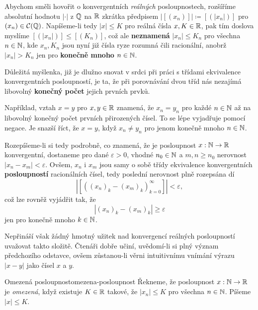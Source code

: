 Abychom směli hovořit o konvergentních \emph{reálných} posloupnostech, rozšíříme
absolutní hodnotu $| \cdot |$ z $\mathbb{Q}$ na $\mathbb{R}$ zkrátka předpisem $|[(x_n)]|
\coloneqq [(|x_n|)]$ pro $(x_n) \in \mathcal{C}(\mathbb{Q})$. Napíšeme-li tedy $|x| \leq
K$ pro reálná čísla $x,K \in \mathbb{R}$, pak tím doslova myslíme $[(|x_n|)] \leq
[(K_n)]$, což ale \textbf{neznamená} $|x_n| \leq K_n$ pro všechna $n \in \mathbb{N}$,
kde $x_n,K_n$ jsou nyní již čísla ryze rozumná čili racionální, anobrž $|x_n| >
K_n$ jen pro \textbf{konečně mnoho} $n \in \mathbb{N}$.

\begin{warning}{}{}
 Důležitá myšlenka, již je dlužno snovat v srdci při práci s třídami ekvivalence
 konvergentních posloupností, je ta, že při porovnávání dvou tříd nás nezajímá
 libovolný \textbf{konečný počet} jejich prvních prvků.

 Například, vztah $x = y$ pro $x,y \in \mathbb{R}$ znamená, že $x_n = y_n$ pro každé $n
 \in \mathbb{N}$ až na libovolný konečný počet prvních přirozených čísel. To se lépe
 vyjadřuje pomocí negace. Je snazší říct, že $x = y$, když $x_n \neq y_n$ pro
 jenom konečně mnoho $n \in \mathbb{N}$.
\end{warning}

Rozepíšeme-li si tedy podrobně, co znamená, že je posloupnost $x:\mathbb{N} \to \mathbb{R}$
konvergentní, dostaneme pro dané $\varepsilon>0$, vhodné $n_0 \in \mathbb{N}$ a $m,n
\geq n_0$ nerovnost $|x_n - x_m| < \varepsilon$. Ovšem, $x_n$ i $x_m$ jsou samy
o sobě třídy ekvivalence konvergentních \textbf{posloupností} racionálních
čísel, tedy poslední nerovnost plně rozepsána dí
\[
 |[((x_n)_{k} - (x_m)_{k})_{k=0}^{\infty}]| < \varepsilon,
\]
což lze rovněž vyjádřit tak, že
\[
 |(x_n)_k - (x_m)_k| \geq \varepsilon
\]
jen pro konečně mnoho $k \in \mathbb{N}$.

Nepřináší však žádný hmotný užitek nad konvergencí reálných posloupností
uvažovat takto složitě. Čtenáři dobře učiní, uvědomí-li si plný význam
předchozího odstavce, ovšem zůstanou-li věrni intuitivnímu vnímání výrazu $|x -
y|$ jako  čísel $x$ a $y$.

\begin{definition}{Omezená posloupnost}{omezena-posloupnost}
 Řekneme, že posloupnost $x:\mathbb{N} \to \mathbb{R}$ je \emph{omezená}, když existuje $K \in
 \mathbb{R}$ takové, že $|x_n| \leq K$ pro všechna $n \in \mathbb{N}$. Píšeme $|x| \leq K$.
\end{definition}


